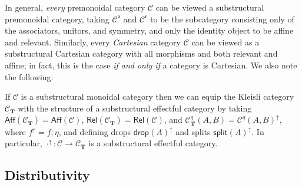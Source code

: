 \documentclass[acmsmall,screen,review]{acmart}
\newcommand{\mc}[1]{\ensuremath{\mathcal{#1}}}
\newcommand{\mb}[1]{\ensuremath{\mathbf{#1}}}
\newcommand{\ms}[1]{\ensuremath{\mathsf{#1}}}
\newcommand{\upg}[2]{{#1}^{\uparrow #2}}
\begin{document}
In general, \textit{every} premonoidal category \(\mc{C}\) can be viewed a
substructural premonoidal category, taking \(\mc{C}^{\ms{a}}\) and
\(\mc{C}^{\ms{r}}\) to be the subcategory consisting only of the associators,
unitors, and symmetry, and only the identity object to be affine and relevant.
Similarly, every \textit{Cartesian} category \(\mc{C}\) can be viewed as a
substructural Cartesian category with all morphisms and both relevant and
affine; in fact, this is the case \textit{if and only if} a category is
Cartesian. We also note the following:
\begin{proposition}
  If \(\mc{C}\) is a substructural monoidal category then we can equip the
  Kleisli category \(\mc{C}_{\mb{T}}\) with the structure of a substructural
  effectful category by taking \(\ms{Aff}(\mc{C}_{\mb{T}}) = \ms{Aff}(\mc{C})\),
  \(\ms{Rel}(\mc{C}_{\mb{T}}) = \ms{Rel}(\mc{C})\), and \(\mc{C}_{\mb{T}}^q(A,
  B) = \upg{\mc{C}^q(A, B)}{}\), where \(\upg{f}{} = f;\eta\), and defining
  drops \(\upg{\ms{drop}(A)}{}\) and splits \(\upg{\ms{split}(A)}{}\). In
  particular, \(\upg{\cdot}{}: \mc{C} \to \mc{C}_{\mb{T}}\) is a substructural
  effectful category.
\end{proposition}

\subsection{Distributivity}
\end{document}
